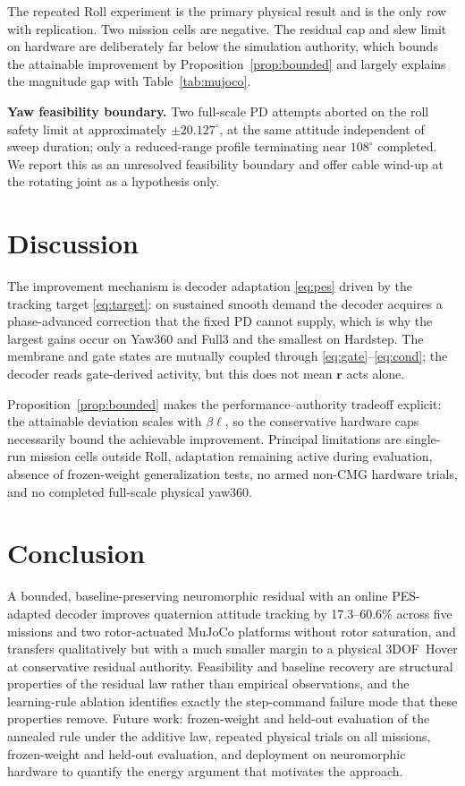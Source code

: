\documentclass[letterpaper,10pt,conference]{IEEEtran}
\begin{document}
The repeated Roll experiment is the primary physical result and is the only
row with replication. Two mission cells are negative. The residual cap and
slew limit on hardware are deliberately far below the simulation authority,
which bounds the attainable improvement by Proposition~\ref{prop:bounded}
and largely explains the magnitude gap with Table~\ref{tab:mujoco}.

\textbf{Yaw feasibility boundary.} Two full-scale PD attempts aborted on the
roll safety limit at approximately $\pm20.127^\circ$, at the same attitude
independent of sweep duration; only a reduced-range profile terminating near
$108^\circ$ completed. We report this as an unresolved feasibility boundary
and offer cable wind-up at the rotating joint as a hypothesis only.

\section{Discussion}
\label{sec:discussion}

The improvement mechanism is decoder adaptation \eqref{eq:pes} driven by the
tracking target \eqref{eq:target}: on sustained smooth demand the decoder
acquires a phase-advanced correction that the fixed PD cannot supply, which
is why the largest gains occur on Yaw360 and Full3 and the smallest on
Hardstep. The membrane and gate states are mutually coupled through
\eqref{eq:gate}--\eqref{eq:cond}; the decoder reads gate-derived activity,
but this does not mean $\bm r$ acts alone.

Proposition~\ref{prop:bounded} makes the performance--authority tradeoff
explicit: the attainable deviation scales with $\beta\bm\ell$, so the
conservative hardware caps necessarily bound the achievable improvement.
Principal limitations are single-run mission cells outside Roll, adaptation
remaining active during evaluation, absence of frozen-weight generalization
tests, no armed non-CMG hardware trials, and no completed full-scale
physical yaw360.

\section{Conclusion}
\label{sec:conclusion}

A bounded, baseline-preserving neuromorphic residual with an online
PES-adapted decoder improves quaternion attitude tracking by 17.3--60.6\%
across five missions and two rotor-actuated MuJoCo platforms without rotor
saturation, and transfers qualitatively but with a much smaller margin to a
physical 3DOF~Hover at conservative residual authority. Feasibility and
baseline recovery are structural properties of the residual law rather than
empirical observations, and the learning-rule ablation identifies exactly
the step-command failure mode that these properties remove. Future work:
frozen-weight and held-out evaluation of the annealed rule under the
additive law, repeated physical trials on all
missions, frozen-weight and held-out evaluation, and deployment on
neuromorphic hardware to quantify the energy argument that motivates the
approach.
\end{document}
